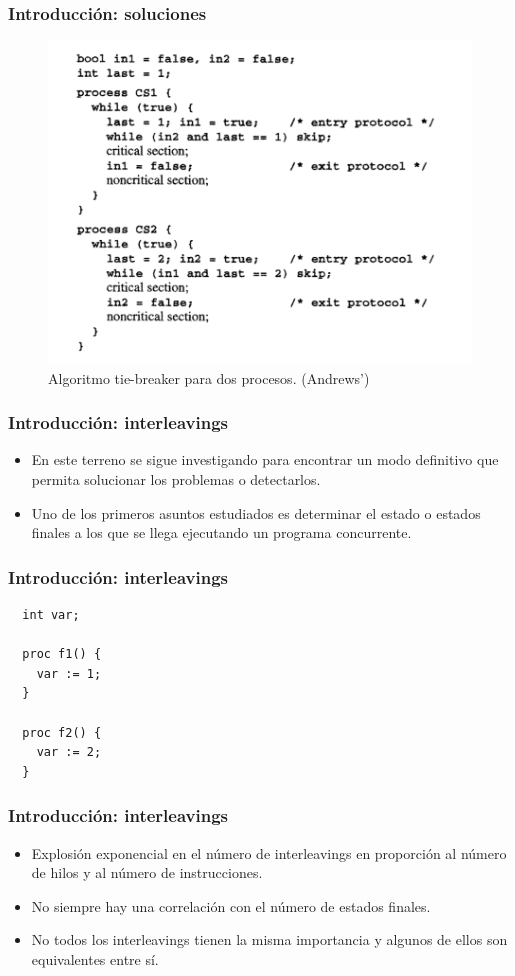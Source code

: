 \documentclass[spanish, a4paper, 12pt, final, slideColor, nototal, colorBG, pdf, noaccumulate, darkblue] {beamer}
\begin{document}
\begin{frame}
  \frametitle{Introducción: soluciones}
  \begin{figure}[h]
    \centering
    \includegraphics[scale=0.5]{tie-breaker.png}
    \caption{Algoritmo tie-breaker para dos procesos. (Andrews')}
  \end{figure}
\end{frame}

\begin{frame}
  \frametitle{Introducción: interleavings}
  \begin{itemize}
    \item En este terreno se sigue investigando para encontrar un modo definitivo que permita solucionar los problemas o detectarlos.
    \item Uno de los primeros asuntos estudiados es determinar el estado o estados finales a los que se llega ejecutando un programa concurrente.
  \end{itemize}
\end{frame}

\begin{frame}[fragile]
  \frametitle{Introducción: interleavings}
  \begin{lstlisting}
  int var;

  proc f1() {
    var := 1;
  }

  proc f2() {
    var := 2;
  }
  \end{lstlisting}
\end{frame}

\begin{frame}
  \frametitle{Introducción: interleavings}
  \begin{itemize}
  \item Explosión exponencial en el número de interleavings en proporción al número de hilos y al número de instrucciones.
  \item No siempre hay una correlación con el número de estados finales.
  \item No todos los interleavings tienen la misma importancia y algunos de ellos son equivalentes entre sí.
  \end{itemize}
\end{frame}
\end{document}
